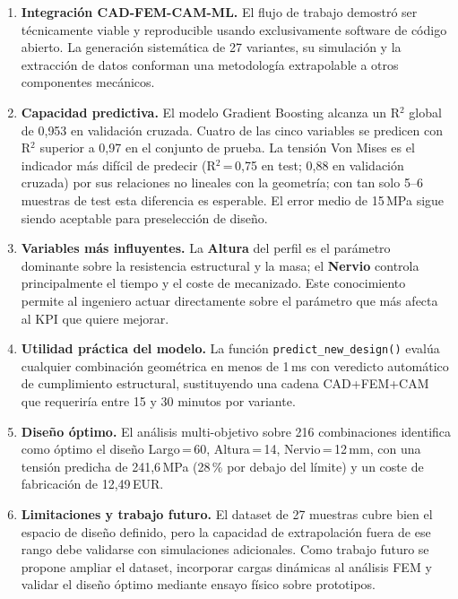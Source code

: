 \documentclass[11pt, a4paper]{article}
\begin{document}
\begin{enumerate}[leftmargin=1.6cm, label=\textbf{\arabic*.}]

  \item \textbf{Integración CAD-FEM-CAM-ML.}
    El flujo de trabajo demostró ser técnicamente viable y reproducible usando
    exclusivamente software de código abierto. La generación sistemática de 27 variantes,
    su simulación y la extracción de datos conforman una metodología extrapolable a otros
    componentes mecánicos.

  \item \textbf{Capacidad predictiva.}
    El modelo Gradient Boosting alcanza un R$^2$ global de 0{,}953 en validación cruzada.
    Cuatro de las cinco variables se predicen con R$^2$ superior a 0{,}97 en el conjunto
    de prueba. La tensión Von Mises es el indicador más difícil de predecir
    (R$^2$\,=\,0{,}75 en test; 0{,}88 en validación cruzada) por sus relaciones
    no lineales con la geometría; con tan solo 5--6 muestras de test esta diferencia
    es esperable. El error medio de 15\,MPa sigue siendo aceptable para preselección
    de diseño.

  \item \textbf{Variables más influyentes.}
    La \textbf{Altura} del perfil es el parámetro dominante sobre la resistencia
    estructural y la masa; el \textbf{Nervio} controla principalmente el tiempo y el
    coste de mecanizado. Este conocimiento permite al ingeniero actuar directamente sobre
    el parámetro que más afecta al KPI que quiere mejorar.

  \item \textbf{Utilidad práctica del modelo.}
    La función \texttt{predict\_new\_design()} evalúa cualquier combinación geométrica
    en menos de 1\,ms con veredicto automático de cumplimiento estructural, sustituyendo
    una cadena CAD+FEM+CAM que requeriría entre 15 y 30 minutos por variante.

  \item \textbf{Diseño óptimo.}
    El análisis multi-objetivo sobre 216 combinaciones identifica como óptimo el diseño
    Largo\,=\,60, Altura\,=\,14, Nervio\,=\,12\,mm, con una tensión predicha de
    241{,}6\,MPa (28\,\% por debajo del límite) y un coste de fabricación de 12{,}49\,EUR.

  \item \textbf{Limitaciones y trabajo futuro.}
    El dataset de 27 muestras cubre bien el espacio de diseño definido, pero la capacidad
    de extrapolación fuera de ese rango debe validarse con simulaciones adicionales.
    Como trabajo futuro se propone ampliar el dataset, incorporar cargas dinámicas al
    análisis FEM y validar el diseño óptimo mediante ensayo físico sobre prototipos.

\end{enumerate}
\end{document}
